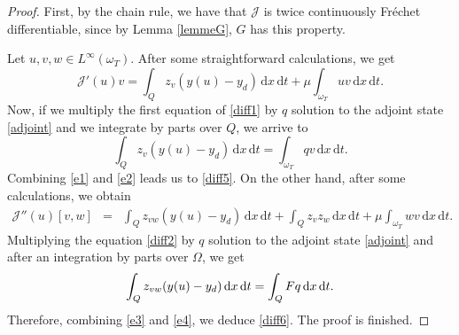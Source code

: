 \documentclass[reqno,twoside]{amsart}
\numberwithin{equation}{section}
\theoremstyle{definition}
\numberwithin{equation}{section}
\def \dis {\displaystyle}
\def \dq {\mathrm{d}x \, \mathrm{d}t}
\begin{document}
\begin{proof}
First, by the chain rule, we have that  $\mathcal{J}$ is twice continuously Fr\'echet differentiable, since by Lemma \ref{lemmeG}, $G$ has this property.\par 		
Let $u,v,w\in L^\infty(\omega_T)$.  After some straightforward calculations, we get
\begin{equation}\label{e1}
	\mathcal{J}'(u)v=\int_{Q} z_v(y(u)-y_d)\,\dq+ \mu \int_{\omega_T}uv\,\dq.
\end{equation}
Now, if we multiply the first equation of \eqref{diff1} by $q$ solution to the adjoint state \eqref{adjoint} and we integrate by parts over $Q$, we arrive to
\begin{equation}\label{e2}
	\int_{Q} z_v(y(u)-y_d)\,\dq=\int_{\omega_T}qv\,\dq.
\end{equation}
Combining \eqref{e1} and \eqref{e2} leads us to \eqref{diff5}. On the other hand, after some calculations, we obtain
\begin{equation}\label{e3}
	\left.
	\begin{array}{lllll}
		\mathcal{J}''(u)[v,w] &=&\dis \int_{Q}z_{vw}(y(u)-y_d)\,\dq + \int_{Q} z_vz_w\,\dq+\mu\int_{\omega_T} wv\,\dq.
	\end{array}
	\right.
\end{equation}	
Multiplying the equation \eqref{diff2} by $q$ solution to the adjoint state \eqref{adjoint} and after an integration by parts over $\Omega$, we get
\begin{equation}\label{e4}
	\left.
	\begin{array}{lllll}
		\dis \dis \int_{Q}z_{vw}(y(u)-y_d)\,\dq=\int_{Q}Fq\,\dq.
	\end{array}
	\right.
\end{equation}	
Therefore, combining \eqref{e3} and \eqref{e4}, we deduce \eqref{diff6}. The proof is finished.
\end{proof}

\end{document}
